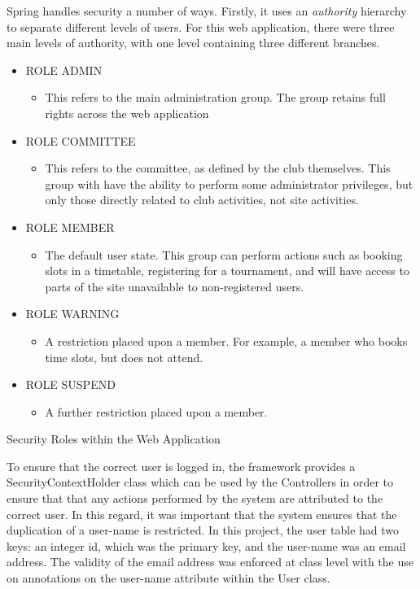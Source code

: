 Spring handles security a number of ways. Firstly, it uses an \textit{authority} hierarchy to separate different levels of users. For this web application, there were three main levels of authority, with one level containing three different branches.
\begin{table}[H]
\begin{itemize}
\item ROLE ADMIN
\begin{itemize}
\item This refers to the main administration group. The group retains full rights across the web application
\end{itemize}
\item ROLE COMMITTEE
\begin{itemize}
\item This refers to the committee, as defined by the club themselves. This group with have the ability to perform some administrator privileges, but only those directly related to club activities, not site activities.
\end{itemize}
\item ROLE MEMBER
\begin{itemize}
\item The default user state. This group can perform actions such as booking slots in a timetable, registering for a tournament, and will have access to parts of the site unavailable to non-registered users.
\end{itemize}
\item ROLE WARNING 
\begin{itemize}
\item A restriction placed upon a member. For example, a member who books time slots, but does not attend.
\end{itemize}
\item ROLE SUSPEND
\begin{itemize}
\item A further restriction placed upon a member.
\end{itemize}
\end{itemize}
\caption{Security Roles within the Web Application}
\end{table}

To ensure that the correct user is logged in, the framework provides a SecurityContextHolder class which can be used by the Controllers in order to ensure that that any actions performed by the system are attributed to the correct user. In this regard, it was important that the system ensures that the duplication of a user-name is restricted. In this project, the user table had two keys: an integer id, which was the primary key, and the user-name was an email address. The validity of the email address was enforced at class level with the use on annotations on the user-name attribute within the User class. \newline

